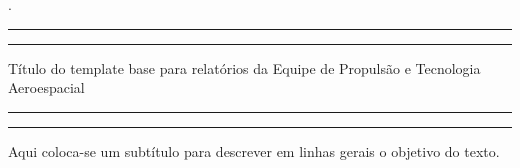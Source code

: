  \begin{titlepage} %

	
	\begin{minipage}[h!]{0.37\textwidth}
		.%
	\end{minipage}
	\begin{minipage}[h!]{0.6\textwidth}
	
		\centering %
	
		\scshape %
	
	
		\rule{\textwidth}{1.6pt}\vspace*{-\baselineskip}\vspace*{2pt} %
		\rule{\textwidth}{0.4pt} %
	
		\vspace{0.75\baselineskip} %
	
		{\LARGE Título do template base para relatórios da Equipe de Propulsão e Tecnologia Aeroespacial\\} %
	
		\vspace{0.75\baselineskip} %
	
		\rule{\textwidth}{0.4pt}\vspace*{-\baselineskip}\vspace{3.2pt} %
		\rule{\textwidth}{1.6pt} %
	
		\vspace{2\baselineskip} %
	
	
		Aqui coloca-se um subtítulo para descrever em linhas gerais o objetivo do texto. %
	
		\vspace*{3\baselineskip} %
	
	

\end{minipage}
\end{titlepage}
